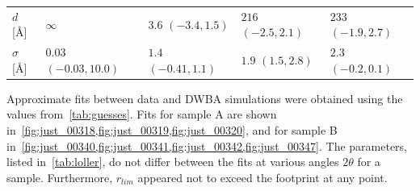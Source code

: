 \documentclass[10pt,twoside, b5paper,pdftex]{report}
\begin{document}
\begin{table}[htbp]
\begin{center}
{\begin{tabular}{p{1.5cm}p{3.2cm}p{3.2cm}p{3.2cm}p{3.2cm}}
		\cmidrule(r){2-5}
		$d$ [\si{\angstrom}] & $\infty$ & $3.6$ $(-3.4, 1.5)$ & $216$ $(-2.5, 2.1)$ & $233$ $(-1.9, 2.7)$\\ 
		$\sigma$ [\si{\angstrom}]  & $0.03$ $(-0.03, 10.0)$ & $1.4$ $(-0.41, 1.1)$ & $1.9$ $(1.5, 2.8)$ & $2.3$ $(-0.2, 0.1)$\\ 
		\bottomrule[2px]	
	\end{tabular}
}	
\end{center}
\end{table}


Approximate fits between data and DWBA simulations were obtained using the values from~\cref{tab:guesses}. Fits for sample A are shown in~\cref{fig:just_00318,fig:just_00319,fig:just_00320}, and for sample B in~\cref{fig:just_00340,fig:just_00341,fig:just_00342,fig:just_00347}.
 The parameters, listed in~\cref{tab:loller}, do not differ between the fits at various angles $2\theta$ for a sample. Furthermore, $r_{lim}$ appeared not to exceed the footprint at any point.
 
\end{document}
